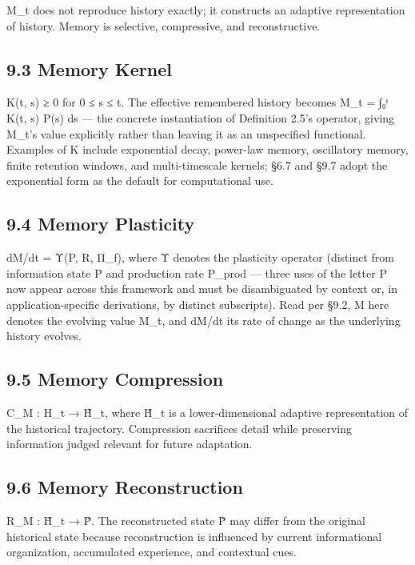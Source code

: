 \documentclass[
]{article}
\begin{document}
M\_t does not reproduce history exactly; it constructs an adaptive
representation of history. Memory is selective, compressive, and
reconstructive.

\hypertarget{memory-kernel}{%
\subsection{9.3 Memory Kernel}\label{memory-kernel}}

K(t, s) ≥ 0 for 0 ≤ s ≤ t. The effective remembered history becomes M\_t
= ∫₀ᵗ K(t, s) P(s) ds --- the concrete instantiation of Definition 2.5's
operator, giving M\_t's value explicitly rather than leaving it as an
unspecified functional. Examples of K include exponential decay,
power-law memory, oscillatory memory, finite retention windows, and
multi-timescale kernels; §6.7 and §9.7 adopt the exponential form as the
default for computational use.

\hypertarget{memory-plasticity}{%
\subsection{9.4 Memory Plasticity}\label{memory-plasticity}}

dM/dt = Υ(P, R, Π\_f), where Υ denotes the plasticity operator (distinct
from information state P and production rate P\_prod --- three uses of
the letter P now appear across this framework and must be disambiguated
by context or, in application-specific derivations, by distinct
subscripts). Read per §9.2, M here denotes the evolving value M\_t, and
dM/dt its rate of change as the underlying history evolves.

\hypertarget{memory-compression}{%
\subsection{9.5 Memory Compression}\label{memory-compression}}

C\_M : H\_t → H̃\_t, where H̃\_t is a lower-dimensional adaptive
representation of the historical trajectory. Compression sacrifices
detail while preserving information judged relevant for future
adaptation.

\hypertarget{memory-reconstruction}{%
\subsection{9.6 Memory Reconstruction}\label{memory-reconstruction}}

R\_M : H̃\_t → P̃. The reconstructed state P̃ may differ from the original
historical state because reconstruction is influenced by current
informational organization, accumulated experience, and contextual cues.
\end{document}

